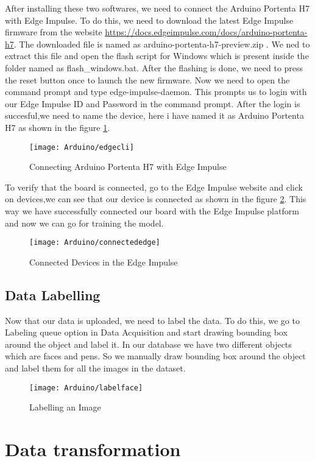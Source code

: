 	
	After installing these two softwares, we need to connect the Arduino Portenta H7 with Edge Impulse. To do this, we need to download the latest Edge Impulse firmware from the website \url{https://docs.edgeimpulse.com/docs/arduino-portenta-h7}. The downloaded file is named as arduino-portenta-h7-preview.zip . We ned to extract this file and open the flash script for Windows which is present inside the folder named as flash\_windows.bat. After the flashing is done, we need to press the reset button once to launch the new firmware. Now we need to open the command prompt and type edge-impulse-daemon. This prompts us to login with our Edge Impulse ID and Password in the command prompt. After the login is succesful,we need to name the device, here i have named it as Arduino Portenta H7 as shown in the figure \ref{figure 9.18}.
	
	\begin{figure}[H]
		\centering
		\texttt{[image: Arduino/edgecli]}
		\caption{Connecting Arduino Portenta H7 with Edge Impulse }
		\label{figure 9.18}
	\end{figure}
	
	
	
	To verify that the board is connected, go to the Edge Impulse website and click on devices,we can see that our device is connected as shown in the figure \ref{figure 9.19}. This way we have successfully connected our board with the Edge Impulse platform and now we can go for training the model.
	\begin{figure}[H]
		\centering
		\texttt{[image: Arduino/connectededge]}
		\caption{Connected  Devices in the Edge Impulse}
		\label{figure 9.19}
	\end{figure}
	\subsection{Data Labelling}
	Now that our data is uploaded, we need to label the data. To do this, we go to Labeling queue option in Data Acquisition and start drawing bounding box around the object and label it. In our database we have two different objects which are faces and pens. So we manually draw bounding box around the object and label them for all the images in the dataset.
	\begin{figure}[H]
		\centering
		\texttt{[image: Arduino/labelface]}
		\caption{Labelling an Image }
		\label{figure 9.15}
	\end{figure}
	\section{Data transformation} 
